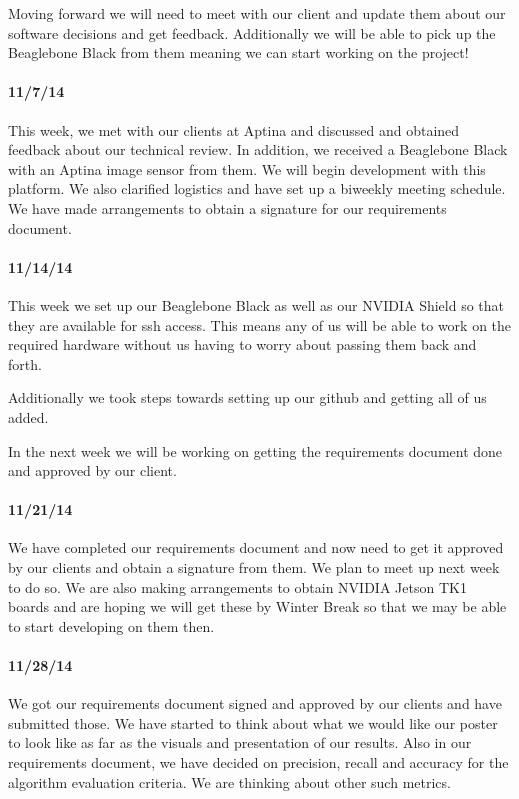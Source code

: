 \documentclass[letterpaper,10pt,titlepage]{article}
\begin{document}
    Moving forward we will need to meet with our client and update them about 
    our software decisions and get feedback. Additionally we will be able to 
    pick up the Beaglebone Black from them meaning we can start working on the
    project!
    \paragraph*{11/7/14}
    This week, we met with our clients at Aptina and discussed and obtained 
    feedback about our technical review. In addition, we received a Beaglebone
    Black with an Aptina image sensor from them. We will begin development with
    this platform. We also clarified logistics and have set up a biweekly 
    meeting schedule. We have made arrangements to obtain a signature for our 
    requirements document. 
    \paragraph*{11/14/14}
    This week we set up our Beaglebone Black as well as our NVIDIA Shield so 
    that they are available for ssh access. This means any of us will be able 
    to work on the required hardware without us having to worry about passing
    them back and forth. 

    Additionally we took steps towards setting up our github and getting all of
    us added. 

    In the next week we will be working on getting the requirements document
    done and approved by our client.
    \paragraph*{11/21/14}
    We have completed our requirements document and now need to get it approved
    by our clients and obtain a signature from them. We plan to meet up next 
    week to do so. We are also making arrangements to obtain NVIDIA Jetson TK1 
    boards and are hoping we will get these by Winter Break so that we may be
    able to start developing on them then. 
    \paragraph*{11/28/14}
    We got our requirements document signed and approved by our clients and 
    have submitted those. We have started to think about what we would like our
    poster to look like as far as the visuals and presentation of our results.
    Also in our requirements document, we have decided on precision, recall and
    accuracy for the algorithm evaluation criteria. We are thinking about other
    such metrics.
\end{document}
